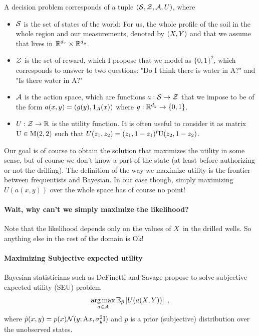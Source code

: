 A decision problem corresponds of a tuple $(\mathcal{S}, \mathcal{Z}, \mathcal{A}, U)$, where
\begin{itemize}
    \item $\mathcal{S}$ is the set of states of the world: For us, the whole profile of the soil in the whole region and our measurements, denoted by $(X, Y)$ and that we assume that lives in $\mathbb{R}^{{d_x}} \times \mathbb{R}^{d_y}$.
    \item $\mathcal{Z}$ is the set of reward, which I propose that we model as $\{0, 1\}^2$, which corresponds to answer to two questions: "Do I think there is water in A?" and "Is there water in A?"
    \item $\mathcal{A}$ is the action space, which are functions $a: \mathcal{S} \rightarrow \mathcal{Z}$ that we impose to be of the form $a(x, y) = (g(y), \mathrm{1}_{A}(x))$ where $g: \mathbb{R}^{d_y} \rightarrow \{0, 1\}$.
    \item $U: \mathcal{Z} \rightarrow \mathbb{R}$ is the utility function. It is often useful to consider it as matrix $\mathrm{U} \in \mathrm{M}(2, 2)$ such that $U(z_1, z_2) = (z_1, 1 - z_1)^t \mathrm{U} (z_2, 1 - z_2)$.
\end{itemize}
Our goal is of course to obtain the solution that maximizes the utility in some sense, but of course we don't know a part of the state (at least before authorizing or not the drilling).
The definition of the way we maximize utility is the frontier between frequentists and Bayesian. In our case though, simply maximizing $U(a(x, y))$ over the whole space has of course no point!

\paragraph{Wait, why can't we simply maximize the likelihood?}

Note that the likelihood depends only on the values of $X$ in the drilled wells. So anything else in the rest of the domain is Ok!

\paragraph{Maximizing Subjective expected utility}

Bayesian statisticians such as DeFinetti and Savage propose to solve subjective expected utility (SEU) problem
\begin{equation}
    \operatorname*{arg\,max}_{a \in \mathcal{A}} \mathbb{E}_{\tilde{p}}\left[U(a(X, Y))\right] \;,
\end{equation}
where $\tilde{p}(x, y) = p(x) \mathcal{N}(y; \mathrm{A}x, \sigma_y^2 \mathrm{I})$ and $p$ is a prior (subjective) distribution over the unobserved states.

